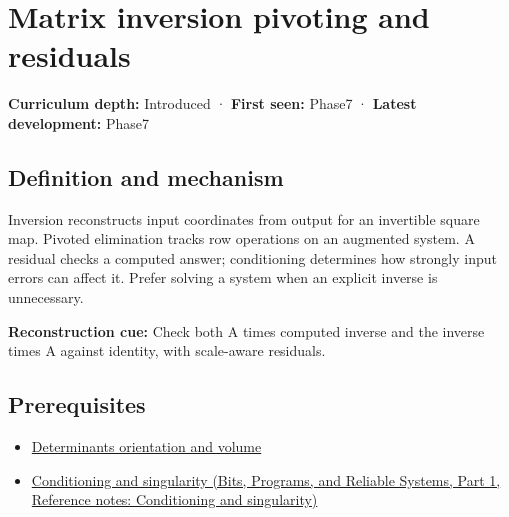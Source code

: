 \hypertarget{appendix-48d2e66378ab}{}\label{referencestart:appendix-48d2e66378ab}
\section{Matrix inversion pivoting and residuals}\label{appendix-48d2e66378ab-matrix-inversion-pivoting-and-residuals}

\hypertarget{appendix-48d2e66378ab-matrix-inversion-pivoting-and-residuals}{}

\textbf{Curriculum depth:} Introduced · \textbf{First seen:} Phase7 · \textbf{Latest development:} Phase7

\begin{allmightroledefinition}

\subsection{Definition and mechanism}\label{appendix-48d2e66378ab-definition-and-mechanism}

\hypertarget{appendix-48d2e66378ab-definition-and-mechanism}{}

Inversion reconstructs input coordinates from output for an invertible square map. Pivoted elimination tracks row operations on an augmented system. A residual checks a computed answer; conditioning determines how strongly input errors can affect it. Prefer solving a system when an explicit inverse is unnecessary.

\end{allmightroledefinition}

\textbf{Reconstruction cue:} Check both A times computed inverse and the inverse times A against identity, with scale-aware residuals.

\subsection{Prerequisites}\label{appendix-48d2e66378ab-prerequisites}

\hypertarget{appendix-48d2e66378ab-prerequisites}{}

\begin{itemize}
\tightlist
\item
  \hyperref[appendix-da478be01d02]{Determinants orientation and volume}
\item
  \href{../01-Bits-Programs-and-Reliable-Systems-P01/main.pdf\#nameddest=appendix-8f6a01f284a7}{Conditioning and singularity (Bits, Programs, and Reliable Systems, Part 1, Reference notes: Conditioning and singularity)}
\end{itemize}

